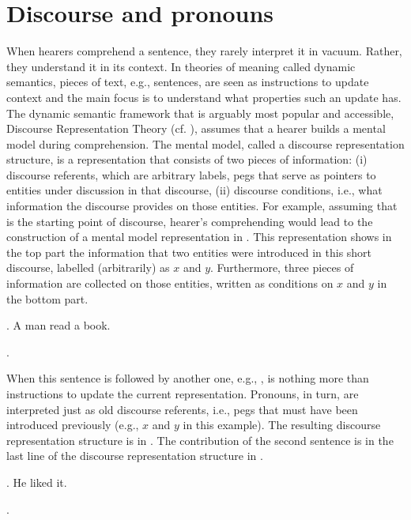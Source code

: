 \documentclass[11pt]{article} %
\begin{document}
\section{Discourse and pronouns}

When hearers comprehend a sentence, they rarely interpret it in vacuum. Rather, they understand it in its context. In theories of meaning called dynamic semantics, pieces of text, e.g., sentences, are seen as instructions to update context and the main focus is to understand what properties such an update has. The dynamic semantic framework that is arguably most popular and accessible, Discourse Representation Theory (cf. \citealt{kamp81, kamp+93}), assumes that a hearer builds a mental model during comprehension. The mental model, called a discourse representation structure, is a representation that consists of two pieces of information: (i) discourse referents, which are arbitrary labels, pegs that serve as pointers to entities under discussion in that discourse, (ii) discourse conditions, i.e., what information the discourse provides on those entities. For example, assuming that \Next is the starting point of discourse, hearer's comprehending would lead to the construction of a mental model representation in \NNext. This representation shows in the top part the information that two entities were introduced in this short discourse, labelled (arbitrarily) as $x$ and $y$. Furthermore, three pieces of information are collected on those entities, written as conditions on $x$ and $y$ in the bottom part.

\ex. A man read a book.

\ex. 

When this sentence is followed by another one, e.g., \Next, \Next is nothing more than instructions to update the current representation. Pronouns, in turn, are interpreted just as old discourse referents, i.e., pegs that must have been introduced previously (e.g., $x$ and $y$ in this example). The resulting discourse representation structure is in \NNext. The contribution of the second sentence is in the last line of the discourse representation structure in \NNext.

\ex. He liked it.

\ex. 
\end{document}
